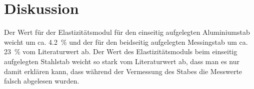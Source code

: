 \section{Diskussion}

Der Wert für der Elastizitätsmodul für den einseitig aufgelegten
Aluminiumstab weicht um ca. \SI{4.2}{\percent} und der für den
beidseitig aufgelegten Messingstab um ca. \SI{23}{\percent} vom
Literaturwert ab. Der Wert des Elastizitätsmoduls beim einseitig
aufgelegten Stahlstab weicht so stark vom Literaturwert ab, dass man es
nur damit erklären kann, dass während der Vermessung des Stabes die
Messwerte falsch abgelesen wurden.
